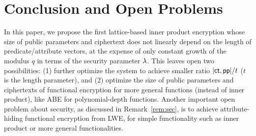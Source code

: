 \section{Conclusion and Open Problems}
In this paper, we propose the first lattice-based inner product encryption whose size of public parameters and ciphertext does not linearly depend on the length of predicate/attribute vectors, at the expense of only constant growth of the modulus $q$ in terms of the security parameter $\lambda$. This leaves open two possibilities: (1) further optimize the system to achieve smaller ratio $|\mathsf{ct}, \mathsf{pp}| / t$ ($t$ is the length parameter), and (2) optimize the size of public parameters and ciphertexts of functional encryption for more general functions (instead of inner product), like ABE for polynomial-depth functions. Another important open problem about security, as discussed in Remark~\ref{rem:sec}, is to achieve attribute-hiding functional encryption from LWE, for simple functionality such as inner product or more general functionalities.

